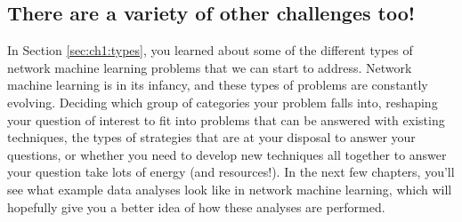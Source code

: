 \subsection{There are a variety of other challenges too!}

In Section \ref{sec:ch1:types}, you learned about some of the different types of network machine learning problems that we can start to address. Network machine learning is in its infancy, and these types of problems are constantly evolving. Deciding which group of categories your problem falls into, reshaping your question of interest to fit into problems that can be answered with existing techniques, the types of strategies that are at your disposal to answer your questions, or whether you need to develop new techniques all together to answer your question take lots of energy (and resources!). In the next few chapters, you'll see what example data analyses look like in network machine learning, which will hopefully give you a better idea of how these analyses are performed.

\newpage